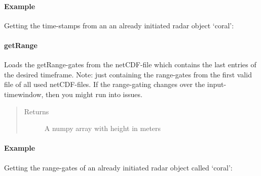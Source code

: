 \documentclass[letterpaper,10pt,english]{sphinxmanual}
\begin{document}
\begin{fulllineitems}
\begin{fulllineitems}
\begin{quote}
\begin{description}
\end{description}\end{quote}
\paragraph{Example}

Getting the time-stamps from an an already initiated radar object ‘coral’:

\begin{sphinxVerbatim}[commandchars=\\\{\}]
\end{sphinxVerbatim}

\end{fulllineitems}



\paragraph{getRange}
\label{\detokenize{generated/MPPy.Instruments.Radar.Radar.getRange::doc}}\label{\detokenize{generated/MPPy.Instruments.Radar.Radar.getRange:getrange}}

\begin{fulllineitems}
\label{\detokenize{generated/MPPy.Instruments.Radar.Radar.getRange:MPPy.Instruments.Radar.Radar.getRange}}
Loads the getRange-gates from the netCDF-file which contains the last entries of the desired timeframe.
Note: just containing the range-gates from the first valid file of all used netCDF-files. If the range-gating
changes over the input-timewindow, then you might run into issues.
\begin{quote}\begin{description}
\item[{Returns}] \leavevmode
A numpy array with height in meters

\end{description}\end{quote}
\paragraph{Example}

Getting the range-gates of an already initiated radar object called ‘coral’:

\begin{sphinxVerbatim}[commandchars=\\\{\}]
\end{sphinxVerbatim}


\end{fulllineitems}
\end{fulllineitems}
\end{document}
